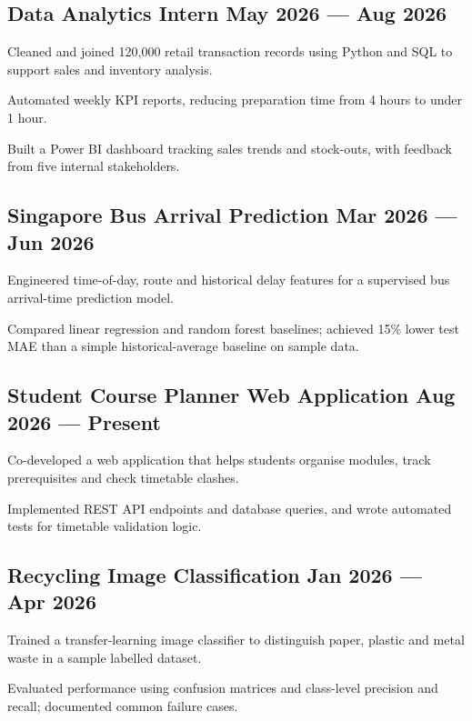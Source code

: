 \subsection{{Data Analytics Intern \hfill May 2026 --- Aug 2026}}
\begin{zitemize}
    \item Cleaned and joined 120,000 retail transaction records using Python and SQL to support sales and inventory analysis.
    \item Automated weekly KPI reports, reducing preparation time from 4 hours to under 1 hour.
    \item Built a Power BI dashboard tracking sales trends and stock-outs, with feedback from five internal stakeholders.
\end{zitemize}

\subsection{{Singapore Bus Arrival Prediction \hfill Mar 2026 --- Jun 2026}}
\begin{zitemize}
    \item Engineered time-of-day, route and historical delay features for a supervised bus arrival-time prediction model.
    \item Compared linear regression and random forest baselines; achieved 15\% lower test MAE than a simple historical-average baseline on sample data.
\end{zitemize}

\subsection{{Student Course Planner Web Application \hfill Aug 2026 --- Present}}
\begin{zitemize}
    \item Co-developed a web application that helps students organise modules, track prerequisites and check timetable clashes.
    \item Implemented REST API endpoints and database queries, and wrote automated tests for timetable validation logic.
\end{zitemize}

\subsection{{Recycling Image Classification \hfill Jan 2026 --- Apr 2026}}
\begin{zitemize}
    \item Trained a transfer-learning image classifier to distinguish paper, plastic and metal waste in a sample labelled dataset.
    \item Evaluated performance using confusion matrices and class-level precision and recall; documented common failure cases.
\end{zitemize}
